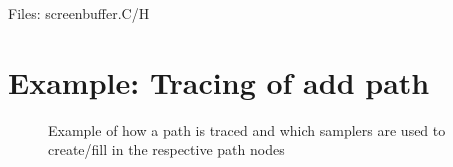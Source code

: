 \documentclass[11pt]{report}
\begin{document}
Files: screenbuffer.C/H


\section{Example: Tracing of add path}

\begin{figure}[h]
  \begin{center} 
        \leavevmode 
        \caption{Example of how a path is traced and which samplers
	are used to create/fill in the respective path nodes} 
        \label{f_rpkfig} 
  \end{center}
\end{figure}
\end{document}
